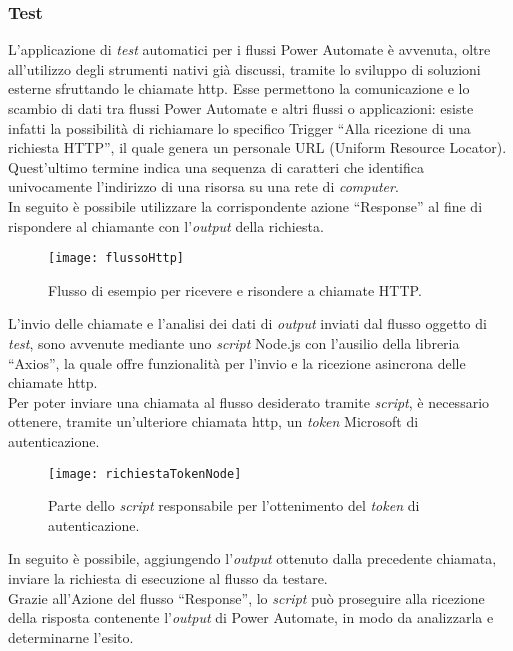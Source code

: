 \subsubsection*{Test}
\label{testProgrammazione}
L'applicazione di \emph{test} automatici per i flussi Power Automate è avvenuta, oltre all'utilizzo degli strumenti nativi già discussi, tramite lo sviluppo di soluzioni esterne sfruttando le chiamate \gls{http}.
Esse permettono la comunicazione e lo scambio di dati tra flussi Power Automate e altri flussi o applicazioni: esiste infatti la possibilità di richiamare lo specifico Trigger “Alla ricezione di una richiesta HTTP”, il quale genera un personale URL (Uniform Resource Locator).
Quest'ultimo termine indica una sequenza di caratteri che identifica univocamente l'indirizzo di una risorsa su una rete di \emph{computer}.\\
In seguito è possibile utilizzare la corrispondente azione “Response” al fine di rispondere al chiamante con l'\emph{output} della richiesta.\\
\begin{figure}[htbp] 
    \centering 
    \texttt{[image: flussoHttp]} 
    \caption{Flusso di esempio per ricevere e risondere a chiamate HTTP.}
    \label{fig:flussoHttp}
\end{figure}
\newline L'invio delle chiamate e l'analisi dei dati di \emph{output} inviati dal flusso oggetto di \emph{test}, sono avvenute mediante uno \emph{script} Node.js con l'ausilio della libreria “Axios”, la quale offre funzionalità per l'invio e la ricezione asincrona delle chiamate \gls{http}.\\
Per poter inviare una chiamata al flusso desiderato tramite \emph{script}, è necessario ottenere, tramite un'ulteriore chiamata \gls{http}, un \emph{token} Microsoft di autenticazione.
\begin{figure}[htbp] 
    \centering 
    \texttt{[image: richiestaTokenNode]} 
    \caption{Parte dello \emph{script} responsabile per l'ottenimento del \emph{token} di autenticazione.}
    \label{fig:richiestaTokenNode}
\end{figure}
\newline In seguito è possibile, aggiungendo l'\emph{output} ottenuto dalla precedente chiamata, inviare la richiesta di esecuzione al flusso da testare.\\
Grazie all'Azione del flusso “Response”, lo \emph{script} può proseguire alla ricezione della risposta contenente l'\emph{output} di Power Automate, in modo da analizzarla e determinarne l'esito.
